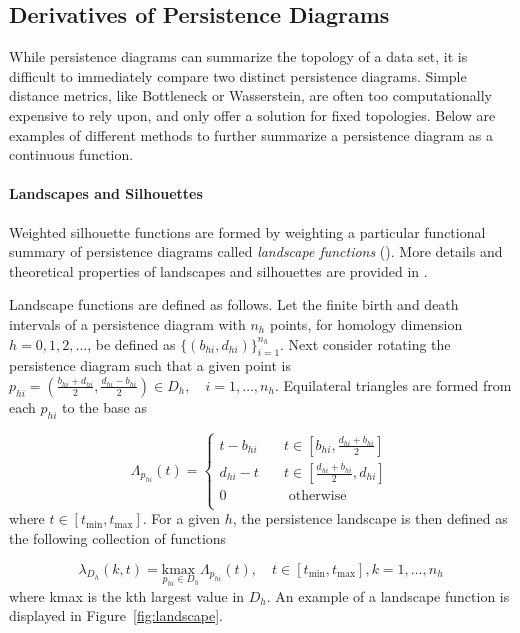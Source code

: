 \documentclass[12pt]{article}
\begin{document}
\subsection{Derivatives of Persistence Diagrams}
While persistence diagrams can summarize the topology of a data set, it is difficult to immediately compare two distinct persistence diagrams. Simple distance metrics, like Bottleneck or Wasserstein, are often too computationally expensive to rely upon, and only offer a solution for fixed topologies. Below are examples of different methods to further summarize a persistence diagram as a continuous function. 

\paragraph{Landscapes and Silhouettes}
Weighted silhouette functions are formed by weighting a particular functional summary of persistence diagrams called \emph{landscape functions} (\cite{bubenik2015statistical}). More details and theoretical properties of landscapes and silhouettes are provided in \cite{chazal2014stochastic}.

Landscape functions are defined as follows.  Let the finite birth and death intervals of a persistence diagram with $n_h$ points, for homology dimension $h = 0, 1, 2, \ldots$, be defined as $\{(b_{hi},d_{hi})\}_{i = 1}^{n_h}$.  Next consider rotating the persistence diagram such that a given point is $p_{hi} = \left(\frac{b_{hi}+d_{hi}}{2}, \frac{d_{hi}-b_{hi}}{2}\right) \in D_h, \quad i = 1, \ldots, n_h$.  Equilateral triangles are formed from each $p_{hi}$ to the base as

\begin{equation*}
\Lambda_{p_{hi}}(t) =
  \begin{cases}
    t - b_{hi}  & \quad t \in [b_{hi}, \frac{d_{hi}+b_{hi}}{2}]\\
    d_{hi} - t  & \quad t \in [\frac{d_{hi}+b_{hi}}{2}, d_{hi}]\\
    0  & \quad \text{ otherwise}\\
  \end{cases}
\end{equation*}
where $t \in [t_{\min}, t_{\max}]$. For a given $h$, the persistence landscape is then defined as the following collection of functions

\begin{equation*}
\lambda_{D_h}(k, t) = \underset{p_{hi}\in D_h}{\text{kmax }} \Lambda_{p_{hi}}(t), \quad t \in [t_{\min}, t_{\max}], k = 1, \ldots, n_h
\end{equation*}
where kmax is the kth largest value in $D_h$.  An example of a landscape function is displayed in Figure~\ref{fig:landscape}.
\end{document}
